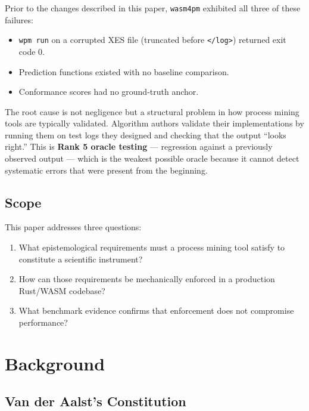 \documentclass[12pt,a4paper]{article}
\begin{document}
Prior to the changes described in this paper, \texttt{wasm4pm} exhibited all three
of these failures:

\begin{itemize}
  \item \texttt{wpm run} on a corrupted XES file (truncated before
    \texttt{</log>}) returned exit code 0.
  \item Prediction functions existed with no baseline comparison.
  \item Conformance scores had no ground-truth anchor.
\end{itemize}

The root cause is not negligence but a structural problem in how process mining
tools are typically validated. Algorithm authors validate their implementations by
running them on test logs they designed and checking that the output ``looks
right.'' This is \textbf{Rank 5 oracle testing} --- regression against a
previously observed output --- which is the weakest possible oracle because it
cannot detect systematic errors that were present from the beginning.

\subsection{Scope}

This paper addresses three questions:

\begin{enumerate}
  \item What epistemological requirements must a process mining tool satisfy to
    constitute a scientific instrument?
  \item How can those requirements be mechanically enforced in a production
    Rust/WASM codebase?
  \item What benchmark evidence confirms that enforcement does not compromise
    performance?
\end{enumerate}

\section{Background}
\label{sec:background}

\subsection{Van der Aalst's Constitution}
\end{document}
